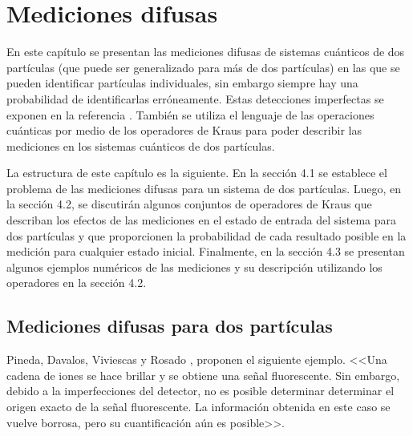 \chapter{Mediciones difusas}

 En este capítulo se presentan las mediciones difusas de sistemas cuánticos de
dos partículas (que puede ser generalizado para más de dos partículas) en las
que se pueden identificar partículas individuales, sin embargo siempre hay una
probabilidad de identificarlas erróneamente. Estas detecciones imperfectas se
exponen en la referencia {\cite{Pineda_2021}}. También se utiliza el lenguaje
de las operaciones cuánticas por medio de los operadores de Kraus para poder
describir las mediciones en los sistemas cuánticos de dos partículas.

La estructura de este capítulo es la siguiente. En la sección 4.1 se establece
el problema de las mediciones difusas para un sistema de dos partículas. Luego,
en la sección 4.2, se discutirán algunos conjuntos de operadores de Kraus que
describan los efectos de las mediciones en el estado de entrada del sistema
para dos partículas y que proporcionen la probabilidad de cada resultado
posible en la medición  para cualquier estado inicial. Finalmente, en la
sección 4.3 se presentan algunos ejemplos numéricos de las mediciones y su
descripción utilizando los operadores en la sección 4.2.

\section{Mediciones difusas para dos partículas} %

Pineda, Davalos, Viviescas y Rosado {\cite{Pineda_2021}}, proponen el siguiente
ejemplo. <<Una cadena de iones se hace brillar  y se obtiene una señal
fluorescente. Sin embargo, debido a la imperfecciones del detector, no es
posible determinar determinar el origen exacto de la señal fluorescente. La
información obtenida en este caso se vuelve borrosa, pero su cuantificación aún
es posible>>.

